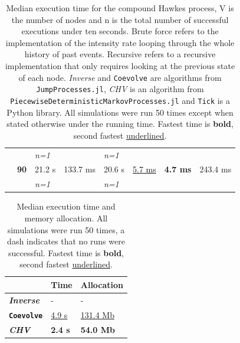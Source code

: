 \documentclass{juliacon}
\begin{document}
\begin{table}
\begin{tabular}{clllllll}
                                &             & \textit{n=1}      &                              & \textit{n=1}     &                                &                              &                              \\
                                & \textbf{90} & 21.2 s            & 133.7 ms                     & 20.6 s           & \underline{5.7 ms}             & \textbf{4.7 ms}              & 243.4 ms                     \\
                                &             & \textit{n=1}      &                              & \textit{n=1}     &                                &                              &                              \\
\bottomrule
\end{tabular}
\caption{Median execution time for the compound Hawkes process, V is the number of nodes and n is the total number of successful executions under ten seconds. Brute force refers to the implementation of the intensity rate looping through the whole history of past events. Recursive refers to a recursive implementation that only requires looking at the previous state of each node. \textit{Inverse} and \texttt{Coevolve} are algorithms from \texttt{JumpProcesses.jl}, \textit{CHV} is an algorithm from \texttt{PiecewiseDeterministicMarkovProcesses.jl} and \texttt{Tick} is a Python library. All simulations were run 50 times except when stated otherwise under the running time. Fastest time is \textbf{bold}, second fastest \underline{underlined}.}
\label{tab:benchmark-hawkes}
\end{table}

\begin{table}
\centering
\begin{tabular}{lll} 
\toprule
 & \textbf{Time} & \textbf{Allocation}  \\ 
\hline
\textbf{\textit{Inverse}} & -  & - \\ 
\textbf{\texttt{Coevolve}} & \underline{4.9 s} & \underline{131.4 Mb}  \\
\textbf{\textit{CHV}} & \textbf{2.4 s} & \textbf{54.0 Mb} \\
\bottomrule
\end{tabular}
\caption{Median execution time and memory allocation. All simulations were run 50 times, a dash indicates that no runs were successful. Fastest time is \textbf{bold}, second fastest \underline{underlined}.}
\label{tab:benchmark-synapse}
\end{table}
\end{document}
